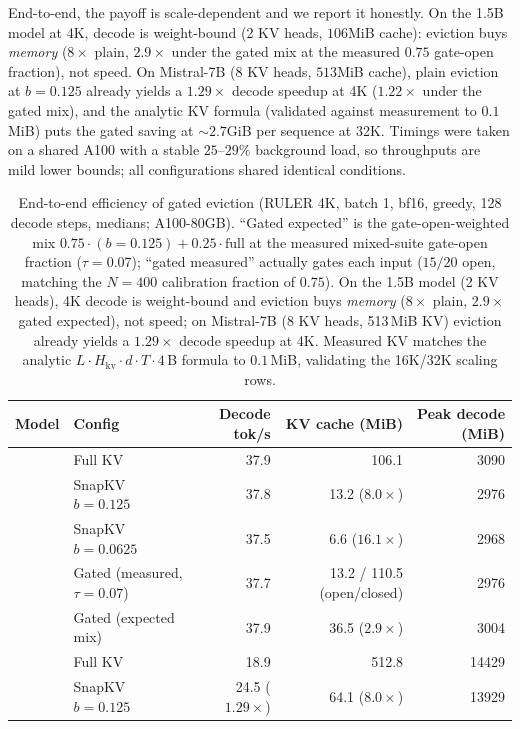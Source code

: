 \documentclass{article}
\begin{document}
End-to-end, the payoff is scale-dependent and we report it honestly.
On the 1.5B model at 4K, decode is weight-bound (2 KV heads, $106$MiB
cache): eviction buys \emph{memory} ($8\times$ plain, $2.9\times$
under the gated mix at the measured $0.75$ gate-open fraction), not
speed. On Mistral-7B (8 KV heads, $513$MiB cache), plain eviction at
$b = 0.125$ already yields a $1.29\times$ decode speedup at 4K
($1.22\times$ under the gated mix), and the analytic KV formula
(validated against measurement to $0.1$MiB) puts the gated saving at
$\sim 2.7$GiB per sequence at 32K. Timings were taken on a shared
A100 with a stable $25$--$29\%$ background load, so throughputs are
mild lower bounds; all configurations shared identical conditions.

\begin{table}[t]
\centering
\caption{End-to-end efficiency of gated eviction (RULER 4K, batch 1,
bf16, greedy, 128 decode steps, medians; A100-80GB). ``Gated expected''
is the gate-open-weighted mix $0.75 \cdot (b{=}0.125) + 0.25 \cdot \mathrm{full}$ at
the measured mixed-suite gate-open fraction ($\tau{=}0.07$); ``gated
measured'' actually gates each input ($15/20$ open, matching the
$N{=}400$ calibration fraction of $0.75$). On the 1.5B model (2 KV
heads), 4K decode is weight-bound and eviction buys \emph{memory}
($8\times$ plain, $2.9\times$ gated expected), not speed; on
Mistral-7B (8 KV heads, 513\,MiB KV) eviction already yields a
$1.29\times$ decode speedup at 4K. Measured KV matches the analytic
$L \cdot H_{\mathrm{kv}} \cdot d \cdot T \cdot 4$\,B formula to
$0.1$\,MiB, validating the 16K/32K scaling rows.}
\label{tab:latency}
\small
\setlength{\tabcolsep}{4pt}
\begin{tabular}{llrrr}
\toprule
Model & Config & Decode tok/s & KV cache (MiB) & Peak decode (MiB) \\
\midrule
{}
 & Full KV                   & 37.9 & 106.1 & 3090 \\
 & SnapKV $b{=}0.125$        & 37.8 & 13.2 ($8.0\times$)  & 2976 \\
 & SnapKV $b{=}0.0625$       & 37.5 & 6.6 ($16.1\times$)  & 2968 \\
 & Gated (measured, $\tau{=}0.07$) & 37.7 & 13.2 / 110.5 (open/closed) & 2976 \\
 & Gated (expected mix)      & 37.9 & 36.5 ($2.9\times$)  & 3004 \\
\midrule
{}
 & Full KV                   & 18.9 & 512.8 & 14429 \\
 & SnapKV $b{=}0.125$        & 24.5 ($1.29\times$) & 64.1 ($8.0\times$) & 13929 \\
\bottomrule
\end{tabular}


\end{table}
\end{document}
